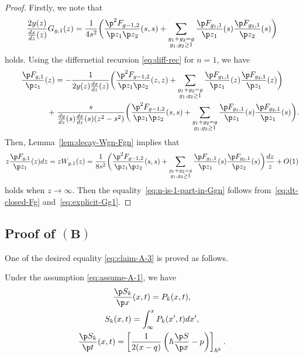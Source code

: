 \begin{proof}
Firstly, we note that
\begin{gather} \label{eq:explicit-Gg1}
\frac{2y(z)}{\frac{dx}{dz}(z)} G_{g,1}(z) =
\frac{1}{4s^{2}}
\biggl(
\frac{\p^{2} F_{g-1,2}}{\p z_{1} \p z_{2}}(s,s) +
\sum_{\substack{g_{1}+g_{2} = g \\ g_{1}, g_{2} \ge 1}}
\frac{\p F_{g_{1}, 1}}{\p z_{1}}(s)
\frac{\p F_{g_{2}, 1}}{\p z_{2}}(s)
\biggr)
\end{gather}
holds. Using the dif\/fernetial recursion \eqref{eq:diff-rec}
for $n=1$, we have
\begin{gather*}
\frac{\p F_{g,1}}{\p z_{1}} (z) =
- \frac{1}{2y(z)\frac{dx}{dz}(z)}
\biggl(
\frac{\p^{2} F_{g-1,2}}{\p z_{1} \p z_{2}}(z,z) +
\sum_{\substack{g_{1}+g_{2} = g \\ g_{1}, g_{2} \ge 1}}
\frac{\p F_{g_{1}, 1}}{\p z_{1}}(z)
\frac{\p F_{g_{2}, 1}}{\p z_{1}}(z)
\biggr)
\\
\hphantom{\frac{\p F_{g,1}}{\p z_{1}} (z) =}{}
+ \frac{s}{\frac{dy}{dz}(s)\frac{dx}{dz}(s)(z^{2}-s^{2})}
\biggl(
\frac{\p^{2} F_{g-1,2}}{\p z_{1} \p z_{2}}(s,s) +
\sum_{\substack{g_{1}+g_{2} = g \\ g_{1}, g_{2} \ge 1}}
\frac{\p F_{g_{1}, 1}}{\p z_{1}}(s)
\frac{\p F_{g_{2}, 1}}{\p z_{1}}(s)
\biggr).
\end{gather*}
Then, Lemma~\ref{lem:decay-Wgn-Fgn}
implies that
\begin{gather*}
z\frac{\p F_{g,1}}{\p z_{1}} (z)dz
= z W_{g,1}(z)  = \frac{1}{8s^{2}} \biggl(
\frac{\p^{2} F_{g-1,2}}{\p z_{1} \p z_{2}}(s,s) +
\sum_{\substack{g_{1}+g_{2} = g \\ g_{1}, g_{2} \ge 1}}
\frac{\p F_{g_{1}, 1}}{\p z_{1}}(s)
\frac{\p F_{g_{2}, 1}}{\p z_{2}}(s)
\biggr) \frac{dz}{z} + O(1)
\end{gather*}
holds when $z \rightarrow \infty$.
Then the equality~\eqref{eq:n-is-1-part-in-Ggn}
follows from~\eqref{eq:dt-closed-Fg} and~\eqref{eq:explicit-Gg1}.
\end{proof}

\subsection[Proof of $(B)$]{Proof of $\boldsymbol{(B)}$}

One of the desired equality \eqref{eq:claim-A-3} is proved as follows.

\begin{lem} \label{prop:integral-for-Sm}
Under the assumption \eqref{eq:assume-A-1}, we have
\begin{gather}
\label{eq:claim-A-5}
\frac{\p S_{k}}{\p x}(x,t)  =   P_{k}(x,t), \\
\label{eq:claim-A-4}
S_{k}(x,t)   =   \int^{x}_{\infty} P_{k}(x',t)dx', \\
\label{eq:claim-A-2}
\frac{\p S_{k}}{\p t}(x,t)   =   \left[\frac{1}{2(x-q)}
\left(\hbar \frac{\p S}{\p x} - p \right) \right]_{\hbar^{k}}.
\end{gather}
\end{lem}


